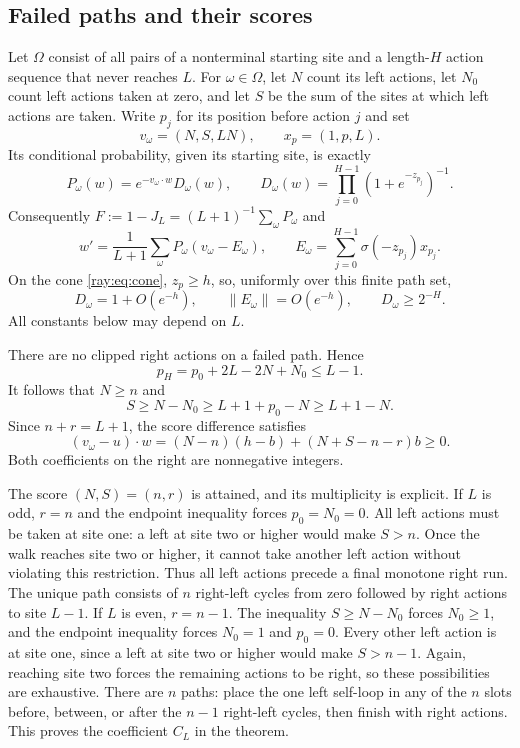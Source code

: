 \documentclass[11pt]{article}
\begin{document}
\subsection{Failed paths and their scores}
Let $\Omega$ consist of all pairs of a nonterminal starting site and a
length-$H$ action sequence that never reaches $L$. For $\omega\in\Omega$,
let $N$ count its left actions, let $N_0$ count left actions taken at zero,
and let $S$ be the sum of the sites at which left actions are taken.
Write $p_j$ for its position before action $j$ and set
\[
 v_\omega=(N,S,LN),\qquad x_p=(1,p,L).
\]
Its conditional probability, given its starting site, is exactly
\begin{equation}\label{ray:eq:path}
 P_\omega(w)=e^{-v_\omega\cdot w}D_\omega(w),\qquad
 D_\omega(w)=\prod_{j=0}^{H-1}(1+e^{-z_{p_j}})^{-1}.
\end{equation}
Consequently $F:=1-J_L=(L+1)^{-1}\sum_\omega P_\omega$ and
\begin{equation}\label{ray:eq:grad}
 w'=\frac1{L+1}\sum_\omega P_\omega(v_\omega-E_\omega),
 \qquad E_\omega=\sum_{j=0}^{H-1}\sigma(-z_{p_j})x_{p_j}.
\end{equation}
On the cone \eqref{ray:eq:cone}, $z_p\ge h$, so, uniformly over this finite
path set,
\begin{equation}\label{ray:eq:errors}
 D_\omega=1+O(e^{-h}),\qquad
 \|E_\omega\|=O(e^{-h}),\qquad D_\omega\ge2^{-H}.
\end{equation}
All constants below may depend on $L$.

There are no clipped right actions on a failed path. Hence
\[
 p_H=p_0+2L-2N+N_0\le L-1.
\]
It follows that $N\ge n$ and
\[
 S\ge N-N_0\ge L+1+p_0-N\ge L+1-N.
\]
Since $n+r=L+1$, the score difference satisfies
\begin{equation}\label{ray:eq:gap}
 (v_\omega-u)\cdot w
 =(N-n)(h-b)+(N+S-n-r)b\ge0.
\end{equation}
Both coefficients on the right are nonnegative integers.

The score $(N,S)=(n,r)$ is attained, and its multiplicity is explicit.
If $L$ is odd, $r=n$ and the endpoint inequality forces $p_0=N_0=0$.
All left actions must be taken at site one: a left at site two or higher
would make $S>n$. Once the walk reaches site two or higher, it cannot take another left
action without violating this restriction. Thus all left actions precede
a final monotone right run. The unique path consists of
$n$ right-left cycles from zero followed by right actions to site $L-1$.
If $L$ is even, $r=n-1$. The inequality $S\ge N-N_0$ forces $N_0\ge1$,
and the endpoint inequality forces $N_0=1$ and $p_0=0$. Every other left
action is at site one, since a left at site two or higher would make
$S>n-1$. Again, reaching site two forces the remaining actions
to be right, so these possibilities are exhaustive. There are $n$ paths: place the one left self-loop
in any of the $n$ slots before, between, or after the $n-1$ right-left
cycles, then finish with right actions. This proves the coefficient $C_L$
in the theorem.
\end{document}
